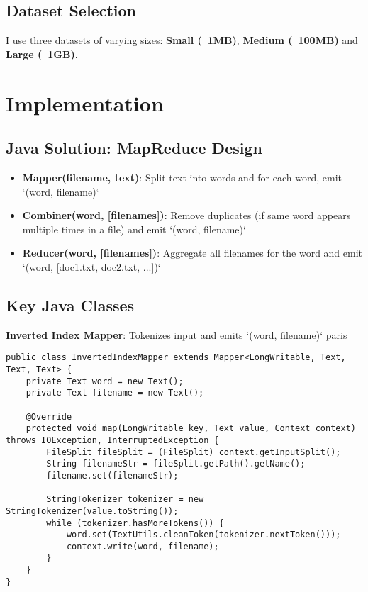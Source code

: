\subsection{Dataset Selection}\label{subsec:dataset-selection}

I use three datasets of varying sizes: \textbf{Small (~1MB)}, \textbf{Medium (~100MB)} and \textbf{Large (~1GB)}.


\section{Implementation}\label{sec:implementation}

\subsection{Java Solution: MapReduce Design}\label{subsec:java-solution:-mapreduce-design}

\begin{itemize}
    \item \textbf{Mapper(filename, text)}: Split text into words and for each word, emit `(word, filename)`
    \item \textbf{Combiner(word, [filenames])}: Remove duplicates (if same word appears multiple times in a file) and emit `(word, filename)`
    \item \textbf{Reducer(word, [filenames])}: Aggregate all filenames for the word and emit `(word, [doc1.txt, doc2.txt, ...])`
\end{itemize}

\subsection{Key Java Classes}\label{subsec:key-java-classes}

\textbf{Inverted Index Mapper}: Tokenizes input and emits `(word, filename)` paris

\begin{lstlisting}[style=javastyle,label={lst:inverted-index-mapper},caption={Inverted Index Mapper}]
public class InvertedIndexMapper extends Mapper<LongWritable, Text, Text, Text> {
    private Text word = new Text();
    private Text filename = new Text();

    @Override
    protected void map(LongWritable key, Text value, Context context) throws IOException, InterruptedException {
        FileSplit fileSplit = (FileSplit) context.getInputSplit();
        String filenameStr = fileSplit.getPath().getName();
        filename.set(filenameStr);

        StringTokenizer tokenizer = new StringTokenizer(value.toString());
        while (tokenizer.hasMoreTokens()) {
            word.set(TextUtils.cleanToken(tokenizer.nextToken()));
            context.write(word, filename);
        }
    }
}
\end{lstlisting}

